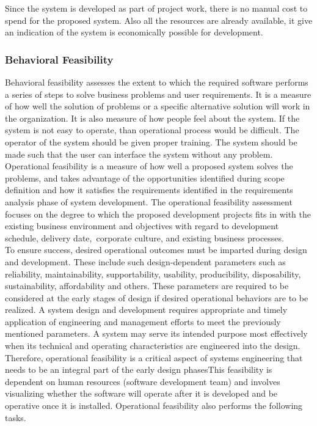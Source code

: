Since the system is developed as part of project work, there is no manual cost to spend for the proposed system. Also all the resources are already available, it give an indication of the system is economically possible for development.

\subsubsection{Behavioral Feasibility}
Behavioral feasibility assesses the extent to which the required software performs a series of steps to solve business problems and user requirements. It is a measure of how well the solution of problems or a specific alternative solution will work in the organization. It is also measure of how people feel about the system. If the system is not easy to operate, than operational process would be difficult. The operator of the system should be given proper training. The system should be made such that the user can interface the system without any problem.\\

Operational feasibility is a measure of how well a proposed system solves the problems, and takes advantage of the opportunities identified during scope definition and how it satisfies the requirements identified in the requirements analysis phase of system development. The operational feasibility assessment focuses on the degree to which the proposed development projects fits in with the existing business environment and objectives with regard to development schedule, delivery date, corporate culture, and existing business processes.\\

To ensure success, desired operational outcomes must be imparted during design and development. These include such design-dependent parameters such as reliability, maintainability, supportability, usability, producibility, disposability, sustainability, affordability and others. These parameters are required to be considered at the early stages of design if desired operational behaviors are to be realized. A system design and development requires appropriate and timely application of engineering and management efforts to meet the previously mentioned parameters. A system may serve its intended purpose most effectively when its technical and operating characteristics are engineered into the design. Therefore, operational feasibility is a critical aspect of systems engineering that needs to be an integral part of the early design phasesThis feasibility is dependent on human resources (software development team) and involves visualizing whether the software will operate after it is developed and be operative once it is installed. Operational feasibility also performs the following tasks.\\

